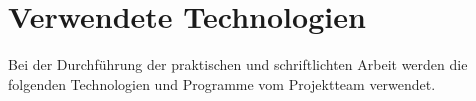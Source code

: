 \section{Verwendete Technologien}
Bei der Durchführung der praktischen und schriftlichten Arbeit werden die folgenden Technologien und Programme vom Projektteam verwendet.\\

\clearpage







\clearpage



\clearpage

